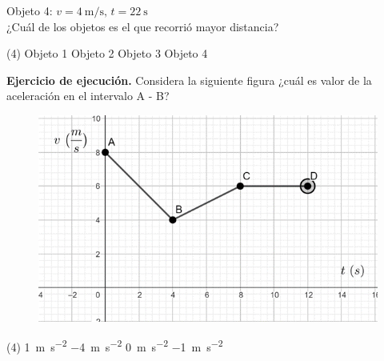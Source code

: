 \documentclass[12pt, letter]{exam}
\begin{document}
\begin{questions}
    Objeto 4: $v = \SI{4}{\meter\per\second}, \, t = \SI{22}{\second}$ \\[0.3em]
    ¿Cuál de los objetos es el que recorrió mayor distancia? 
    \begin{tasks}(4)
        \task Objeto 1
        \task Objeto 2
        \task Objeto 3
        \task Objeto 4        
    \end{tasks}
    \question \textbf{Ejercicio de ejecución.} Considera la siguiente figura ¿cuál es valor de la aceleración en el intervalo A - B?
    \begin{figure}[H]
        \centering
        \includegraphics[scale=1.5]{Imagenes/Examen_Grafica_02.png}
    \end{figure}
    \begin{tasks}(4)
        \task \SI{1}{\meter\per\square\second}
        \task \SI{-4}{\meter\per\square\second}
        \task \SI{0}{\meter\per\square\second}
        \task \SI{-1}{\meter\per\square\second}
    \end{tasks}
    

\end{questions}
\end{document}
